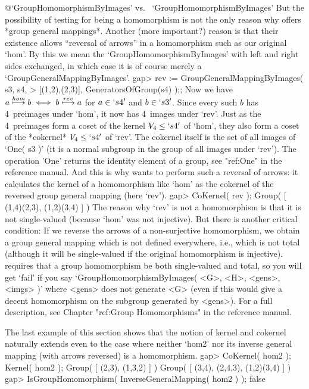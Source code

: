 %
%
{@\noexpand `GroupHomomorphismByImages' vs.\ %
\noexpand `GroupHomomorphismByImages'}%
But the  possibility of testing for being  a homomorphism is not the only
reason  why    {\GAP} offers  *group   general  mappings*.  Another (more
important?) reason is that  their existence allows ``reversal of arrows''
in a  homomorphism such   as  our original  `hom'. By   this we mean  the
`GroupHomomorphismByImages' with left and right sides exchanged, in which
case it is of course merely a `GroupGeneralMappingByImages'.
\beginexample
gap> rev := GroupGeneralMappingByImages( s3, s4,
>           [(1,2),(2,3)], GeneratorsOfGroup(s4) );;
\endexample
Now we have $a\buildrel hom\over\longmapsto b \iff b\buildrel
rev\over\longmapsto a$ for $a\in `s4'$ and $b\in `s3'$. Since every
such $b$ has 4~preimages under `hom', it now has 4~images under `rev'.
Just as the 4~preimages form a coset of the kernel $V_4\le `s4'$ of
`hom', they also form a coset of the *cokernel* $V_4\le `s4'$ of
`rev'.  The cokernel itself is the set of all images of `One( s3 )'
(it is a normal subgroup in the group of all images under `rev'). The
operation 'One' returns the identity element of a group, see "ref:One"
in the reference manual.  And this is why {\GAP} wants to perform such
a reversal of arrows: it calculates the kernel of a homomorphism like
`hom' as the cokernel of the reversed group general mapping (here
`rev').
\beginexample
gap> CoKernel( rev );
Group( [ (1,4)(2,3), (1,2)(3,4) ] )
\endexample
{}%
%
The  reason  why  `rev'   is not  a    homomorphism is  that   it is  not
single-valued  (because `hom' was   not injective). But there  is another
critical  condition: If   we   reverse the arrows   of  a  non-surjective
homomorphism,  we  obtain a group  general mapping  which  is not defined
everywhere, i.e.,  which is not total  (although it will be single-valued
if the original homomorphism is  injective). {\GAP} requires that a group
homomorphism be  both  single-valued  and total,
so you will get `fail' if you say
`GroupHomomorphismByImages( <G>, <H>, <gens>, <imgs> )' where <gens> does
not generate <G> (even if this would give a decent homomorphism on the
subgroup generated by <gens>).  For a full description,
see Chapter "ref:Group Homomorphisms" in the reference manual.

The last  example of this   section shows that  the  notion of kernel and
cokernel naturally extends even to the case  where neither `hom2' nor its
inverse general mapping (with arrows reversed) is a homomorphism.
\beginexample
gap> CoKernel( hom2 );  Kernel( hom2 );
Group( [ (2,3), (1,3,2) ] )
Group( [ (3,4), (2,4,3), (1,2)(3,4) ] )
gap> IsGroupHomomorphism( InverseGeneralMapping( hom2 ) );
false
\endexample


